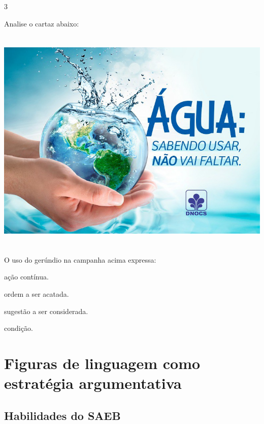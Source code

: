 \num{3}

Analise o cartaz abaixo:

\includegraphics[width=5.90551in,height=4.29167in]{./imgSAEB_7_POR/media/image13.png}


O uso do gerúndio na campanha acima expressa:

\begin{escolha}

  \item ação contínua.
  \item ordem a ser acatada.
  \item sugestão a ser considerada.
  \item condição.

\end{escolha}


\chapter{Figuras de linguagem como estratégia argumentativa}

\section{Habilidades do SAEB}

